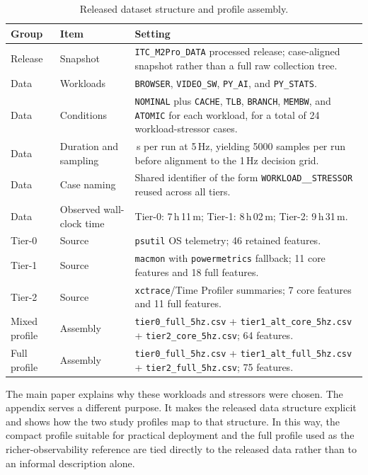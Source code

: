 \begin{table}[!t]
\centering
\caption{Released dataset structure and profile assembly.}
\label{tab:app_release_structure}
{\scriptsize
\setlength{\tabcolsep}{2.6pt}
\renewcommand{\arraystretch}{1.00}
\begin{tabular*}{\textwidth}{@{\extracolsep{\fill}}>{\raggedright\arraybackslash}p{}>{\raggedright\arraybackslash}p{}>{\raggedright\arraybackslash}p{}@{}}
\toprule
Group & Item & Setting \\
\midrule
Release & Snapshot & \texttt{ITC\_M2Pro\_DATA} processed release; case-aligned snapshot rather than a full raw collection tree. \\
Data & Workloads & \texttt{BROWSER}, \texttt{VIDEO\_SW}, \texttt{PY\_AI}, and \texttt{PY\_STATS}. \\
Data & Conditions & \texttt{NOMINAL} plus \texttt{CACHE}, \texttt{TLB}, \texttt{BRANCH}, \texttt{MEMBW}, and \texttt{ATOMIC} for each workload, for a total of 24 workload-stressor cases. \\
Data & Duration and sampling & 1000\,s per run at 5\,Hz, yielding 5000 samples per run before alignment to the 1\,Hz decision grid. \\
Data & Case naming & Shared identifier of the form \texttt{WORKLOAD\_\_STRESSOR} reused across all tiers. \\
Data & Observed wall-clock time & Tier-0: 7\,h\,11\,m; Tier-1: 8\,h\,02\,m; Tier-2: 9\,h\,31\,m. \\
Tier-0 & Source & \texttt{psutil} OS telemetry; 46 retained features. \\
Tier-1 & Source & \texttt{macmon} with \texttt{powermetrics} fallback; 11 core features and 18 full features. \\
Tier-2 & Source & \texttt{xctrace}/Time Profiler summaries; 7 core features and 11 full features. \\
Mixed profile & Assembly & \texttt{tier0\_full\_5hz.csv} + \texttt{tier1\_alt\_core\_5hz.csv} + \texttt{tier2\_core\_5hz.csv}; 64 features. \\
Full profile & Assembly & \texttt{tier0\_full\_5hz.csv} + \texttt{tier1\_alt\_full\_5hz.csv} + \texttt{tier2\_full\_5hz.csv}; 75 features. \\
\bottomrule
\end{tabular*}
}
\end{table}

The main paper explains why these workloads and stressors were chosen. The appendix serves a different purpose. It makes the released data structure explicit and shows how the two study profiles map to that structure. In this way, the compact profile suitable for practical deployment and the full profile used as the richer-observability reference are tied directly to the released data rather than to an informal description alone.

